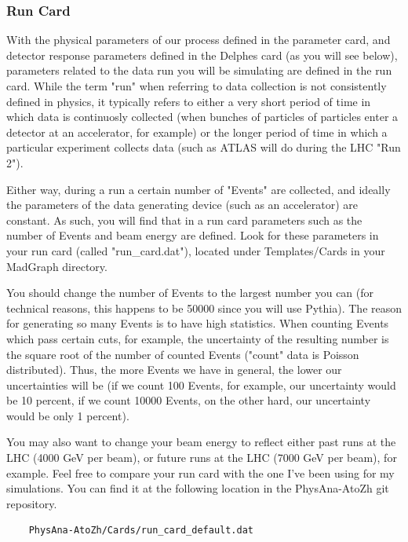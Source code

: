 \documentclass{article}
\begin{document}
\subsubsection{Run Card}
\label{sec:runCard}

With the physical parameters of our process defined in the parameter card, and detector response parameters defined in the Delphes card (as you will see below),
parameters related to the data run you will be simulating are defined in the run card. While the term "run" when referring to data collection
is not consistently defined in physics, it typically refers to either a very short period of time in which data is continuosly collected (when bunches
of particles of particles enter a detector at an accelerator, for example) or the longer period of time in which a particular experiment collects data
(such as ATLAS will do during the LHC "Run 2").

\bigskip

Either way, during a run a certain number of "Events" are collected, and ideally the parameters of the data generating device (such as
an accelerator) are constant. As such, you will find that in a run card parameters such as the number of Events and beam energy are defined.
Look for these parameters in your run card (called "run\_card.dat"), located under Templates/Cards in your MadGraph directory.

\bigskip

You should change the number of Events to the largest number you can (for technical reasons, this happens to be 50000 since you will use Pythia).
The reason for generating so many Events is to have high statistics. When counting Events which pass certain cuts, for example, the uncertainty of
the resulting number is the square root of the number of counted Events ("count" data is Poisson distributed). Thus, the more Events we have
in general, the lower our uncertainties will be (if we count 100 Events, for example, our uncertainty would be 10 percent, if we count 10000 Events,
on the other hard, our uncertainty would be only 1 percent).

\bigskip

You may also want to change your beam energy to reflect either past runs at the LHC (4000 GeV per beam), or future runs at the LHC (7000 GeV per beam), for example.
Feel free to compare your run card with the one I've been using for my simulations. You can find it at the following location
in the PhysAna-AtoZh git repository.

\begin{verbatim}
	PhysAna-AtoZh/Cards/run_card_default.dat
\end{verbatim}
\end{document}
